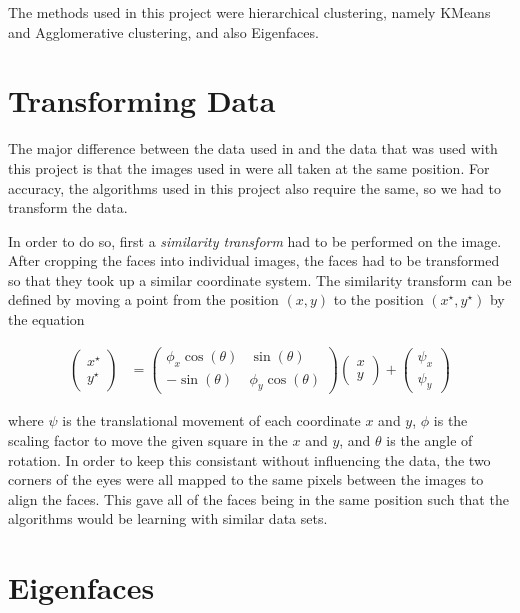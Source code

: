 \documentclass{article}
\begin{document}
The methods used in this project were hierarchical clustering, namely KMeans and Agglomerative clustering, and also Eigenfaces.

\section*{Transforming Data}

The major difference between the data used in \cite{MormonID} and the data that was used with this project is that the images used in \cite{MormonID} were all taken at the same position. For accuracy, the algorithms used in this project also require the same, so we had to transform the data. 

In order to do so, first a {\em similarity transform} had to be performed on the image. After cropping the faces into individual images, the faces had to be transformed so that they took up a similar coordinate system. The similarity transform can be defined by moving a point from the position $(x,y)$ to the position $(x^{\star}, y^{\star})$ by the equation

\begin{align*}
  \begin{pmatrix}
    x^{\star} \\
    y^{\star}
\end{pmatrix} &= \begin{pmatrix}
\phi_{x}\cos(\theta) & \sin(\theta)\\
-\sin(\theta) & \phi_{y}\cos(\theta)
\end{pmatrix}  \begin{pmatrix}
    x \\
    y
\end{pmatrix} +   \begin{pmatrix}
    \psi_{x} \\
    \psi_{y}
\end{pmatrix}
\end{align*}

where $\psi$ is the translational movement of each coordinate $x$ and $y$, $\phi$ is the scaling factor to move the given square in the $x$ and $y$, and $\theta$ is the angle of rotation. In order to keep this consistant without influencing the data, the two corners of the eyes were all mapped to the same pixels between the images to align the faces. This gave all of the faces being in the same position such that the algorithms would be learning with similar data sets.

\section*{Eigenfaces}
\end{document}
